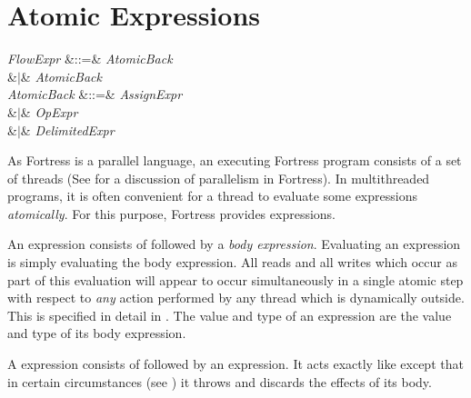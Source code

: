 %
%
%
%

\section{Atomic Expressions}


\begin{Grammar}
\emph{FlowExpr} &::=&   \emph{AtomicBack}\\
&$|$&  \emph{AtomicBack} \\

\emph{AtomicBack}
&::=& \emph{AssignExpr}\\
&$|$& \emph{OpExpr}\\
&$|$& \emph{DelimitedExpr}\\

\end{Grammar}

As Fortress is a parallel language, an executing Fortress program consists
of a set of threads (See  for a discussion of
parallelism in Fortress).  In multithreaded programs,
it is often convenient for a thread to evaluate some expressions
\emph{atomically}.  For this purpose, Fortress provides 
expressions.


An  expression consists of 
followed by a \emph{body expression}.  Evaluating an 
expression is simply evaluating the body expression.  All reads and
all writes which occur as part of this evaluation will appear to occur
simultaneously in a single atomic step with respect to \emph{any}
action performed by any thread which is dynamically outside.  This is
specified in detail in .  The value and type of an
 expression are the value and type of its body expression.

A  expression consists of  followed by
an expression.  It acts exactly like  except that in
certain circumstances (see ) it throws
 and discards the effects of its body.

